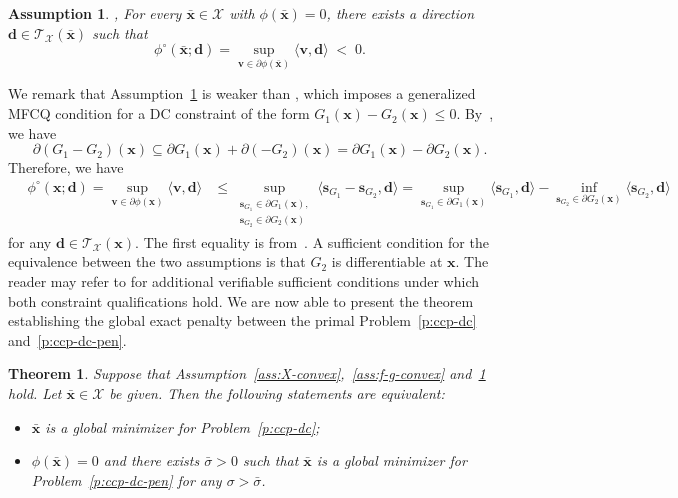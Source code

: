 \documentclass[11pt]{article}
\newtheorem{theorem}{Theorem}[section]
\newtheorem{assumption}{Assumption}
\def\bs{\boldsymbol}
\def\T{\mathcal{T}}
\def\X{\mathcal{X}}
\begin{document}
\begin{assumption}{\cite[theorem 2.4]{burke1991exact}, \cite[theorem 3.2]{borwein1986stability}}\label{ass:mfcq-dc}
For every $\bar{\bs{x}}\in \X$ with $\phi(\bar{\bs{x}})=0$, there exists a direction $\bs{d}\in\T_{\X}(\bar{\bs{x}})$ such that
\begin{equation*}
\phi^\circ(\bar{\bs{x}};\bs{d}) = \sup_{\bs{v}\in\partial \phi(\bar{\bs{x}})}\langle \bs{v},\bs{d}\rangle\;<\;0.
\end{equation*}
\end{assumption}

We remark that Assumption~\ref{ass:mfcq-dc} is weaker than \cite[Assumption~2]{wang2025proximal}, which imposes a generalized MFCQ condition for a DC constraint of the form $G_1(\bs{x})-G_2(\bs{x})\le 0$. By~\cite[proposition 2.3.1, 2.3.3]{clarke1990optimization}, we have
\[
\partial(G_1 - G_2)(\bs{x}) \subseteq \partial G_1(\bs{x}) + \partial (-G_2)(\bs{x}) = \partial G_1(\bs{x}) - \partial G_2(\bs{x}).
\]
Therefore, we have
\begin{align*}
\quad  \phi^\circ(\bs{x};\bs{d}) 
= \sup_{\bs{v}\in\partial \phi(\bs{x})}\langle \bs{v},\bs{d}\rangle 
&\leq \sup_{\substack{\bs{s}_{G_1}\in\partial G_1(\bs{x}),\\ \bs{s}_{G_2}\in\partial G_2(\bs{x})}}
\big\langle \bs{s}_{G_1}-\bs{s}_{G_2},\bs{d}\big\rangle = \sup_{\bs{s}_{G_1}\in\partial G_1(\bs{x})}\langle \bs{s}_{G_1},\bs{d}\rangle
-\inf_{\bs{s}_{G_2}\in\partial G_2(\bs{x})}\langle \bs{s}_{G_2},\bs{d}\rangle
\end{align*}
for any $\bs{d}\in\T_{\X}(\bs{x})$. The first equality is from~\cite[proposition 2.1.2(b)]{clarke1990optimization}. 
A sufficient condition for the equivalence between the two assumptions is that $G_2$ is differentiable at $\bs{x}$. The reader may refer to \cite[remark~2]{wang2025proximal} for additional verifiable sufficient conditions under which both constraint qualifications hold. We are now able to present the theorem establishing the global exact penalty between the primal Problem~\eqref{p:ccp-dc} and~\eqref{p:ccp-dc-pen}.

\begin{theorem} \label{thm:global-exact-dc}
Suppose that Assumption~\ref{ass:X-convex},~\ref{ass:f-g-convex} and~\ref{ass:mfcq-dc} hold. Let $\bar{\bs{x}} \in\X$ be given. Then the following statements are equivalent:
\begin{itemize}
\item[(a)] $\bar{\bs{x}}$ is a global minimizer for Problem~\eqref{p:ccp-dc};
\item[(b)] $\phi(\bar{\bs{x}})=0$ and there exists $\bar\sigma>0$ such that $\bar{\bs{x}}$ is a global minimizer for Problem~\eqref{p:ccp-dc-pen} for any $\sigma > \bar\sigma$.
\end{itemize}
\end{theorem}
\end{document}
